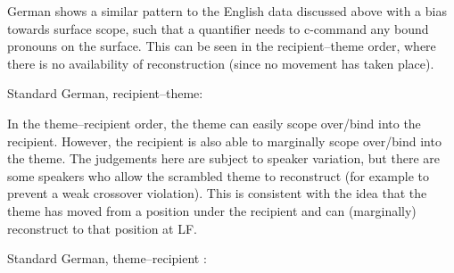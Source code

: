 German shows a similar pattern to the English data discussed above with a bias towards surface scope, such that a quantifier needs to c-command any bound pronouns on the surface. This can be seen in the recipient--theme order, where there is no availability of reconstruction (since no movement has taken place).

\begin{exe}
	\ex Standard German, recipient--theme:
\begin{xlist}
\end{xlist}
\end{exe}

In the theme--recipient order, the theme can easily scope over/bind into the recipient. However, the recipient is also able to marginally scope over/bind into the theme. The judgements here are subject to speaker variation, but there are some speakers who allow the scrambled theme to reconstruct (for example to prevent a weak crossover violation). This is consistent with the idea that the theme has moved from a position under the recipient and can (marginally) reconstruct to that position at LF.

\begin{exe}
	\ex Standard German, theme--recipient :
\begin{xlist}
\end{xlist}
\end{exe}



